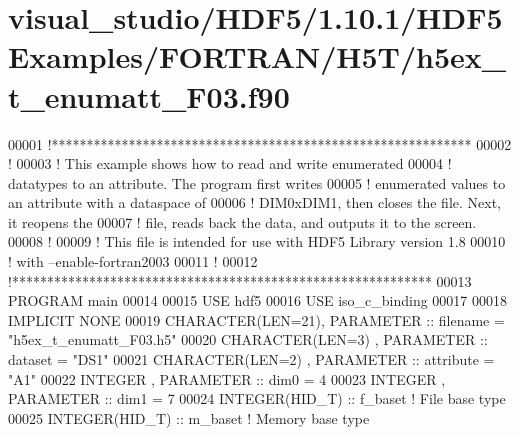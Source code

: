 \hypertarget{visual__studio_2_h_d_f5_21_810_81_2_h_d_f5_examples_2_f_o_r_t_r_a_n_2_h5_t_2h5ex__t__enumatt___f03_8f90_source}{}\section{visual\+\_\+studio/\+H\+D\+F5/1.10.1/\+H\+D\+F5\+Examples/\+F\+O\+R\+T\+R\+A\+N/\+H5\+T/h5ex\+\_\+t\+\_\+enumatt\+\_\+\+F03.f90}
\label{visual__studio_2_h_d_f5_21_810_81_2_h_d_f5_examples_2_f_o_r_t_r_a_n_2_h5_t_2h5ex__t__enumatt___f03_8f90_source}

\begin{DoxyCode}
00001 \textcolor{comment}{!************************************************************}
00002 \textcolor{comment}{!}
00003 \textcolor{comment}{!  This example shows how to read and write enumerated}
00004 \textcolor{comment}{!  datatypes to an attribute.  The program first writes}
00005 \textcolor{comment}{!  enumerated values to an attribute with a dataspace of}
00006 \textcolor{comment}{!  DIM0xDIM1, then closes the file.  Next, it reopens the}
00007 \textcolor{comment}{!  file, reads back the data, and outputs it to the screen.}
00008 \textcolor{comment}{!}
00009 \textcolor{comment}{!  This file is intended for use with HDF5 Library version 1.8}
00010 \textcolor{comment}{!  with --enable-fortran2003}
00011 \textcolor{comment}{!}
00012 \textcolor{comment}{!************************************************************}
00013 \textcolor{keyword}{PROGRAM} main
00014 
00015   \textcolor{keywordtype}{USE }hdf5
00016   \textcolor{keywordtype}{USE }iso\_c\_binding
00017 
00018   \textcolor{keywordtype}{IMPLICIT NONE}
00019   \textcolor{keywordtype}{CHARACTER(LEN=21)}, \textcolor{keywordtype}{PARAMETER} :: filename  = \textcolor{stringliteral}{"h5ex\_t\_enumatt\_F03.h5"}
00020   \textcolor{keywordtype}{CHARACTER(LEN=3)} , \textcolor{keywordtype}{PARAMETER} :: dataset   = \textcolor{stringliteral}{"DS1"}
00021   \textcolor{keywordtype}{CHARACTER(LEN=2)} , \textcolor{keywordtype}{PARAMETER} :: attribute = \textcolor{stringliteral}{"A1"}
00022   \textcolor{keywordtype}{INTEGER}          , \textcolor{keywordtype}{PARAMETER} :: dim0      = 4
00023   \textcolor{keywordtype}{INTEGER}          , \textcolor{keywordtype}{PARAMETER} :: dim1      = 7
00024   \textcolor{keywordtype}{INTEGER(HID\_T)}               :: f\_baset  \textcolor{comment}{! File base type}
00025   \textcolor{keywordtype}{INTEGER(HID\_T)}               :: m\_baset  \textcolor{comment}{! Memory base type}

\end{DoxyCode}
